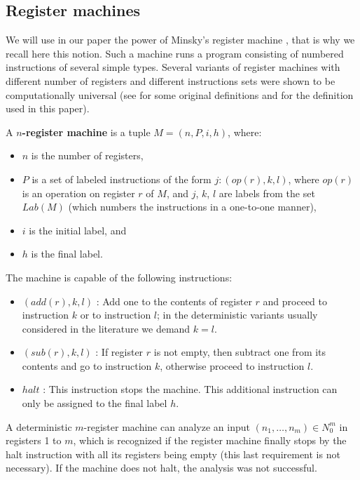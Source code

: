 \documentclass[a4paper,10pt]{article}
\begin{document}
\subsection{Register machines} %
\label{sub:register_machines}
  We will use in our paper the power of Minsky's register machine \cite{Ionescu:jucs_10_5:on_p_systems_with}, that is why we recall here this notion. Such a machine runs a program consisting of numbered instructions of several simple types. Several variants of register machines with different number of registers and different instructions sets were shown to be computationally universal (see \cite{Ibarra:2005:SPS:2111772.2111880} for some original definitions and \cite{Khrisna03threeuniversality} for the definition used in this paper).

  \begin{definicia}
    A {\bf $n$-register machine} is a tuple $M = (n,P,i,h)$, where:
    \begin{itemize}
      \item $n$ is the number of registers,
      \item $P$ is a set of labeled instructions of the form $j : (op(r),k,l)$, where $op(r)$ is an operation on register $r$ of $M$, and $j$, $k$, $l$ are labels from the set $Lab(M)$ (which numbers the instructions in a one-to-one manner),
      \item $i$ is the initial label, and
      \item $h$ is the final label.
    \end{itemize}
  \end{definicia}

  The machine is capable of the following instructions:
  \begin{itemize}
    \item $(add(r),k,l)$ : Add one to the contents of register $r$ and proceed to instruction $k$ or to instruction $l$; in the deterministic variants usually considered in the literature we demand $k = l$.
    \item $(sub(r),k,l)$ : If register $r$ is not empty, then subtract one from its contents and go to instruction $k$, otherwise proceed to instruction $l$.
    \item $halt$ : This instruction stops the machine. This additional instruction can only be assigned to the final label $h$.
  \end{itemize}

  A deterministic $m$-register machine can analyze an input $(n_1,\dots,n_m)\in N_0^m$ in registers 1 to $m$, which is recognized if the register machine finally stops by the halt instruction with all its registers being empty (this last requirement is not necessary). If the machine does not halt, the analysis was not successful.
\end{document}
